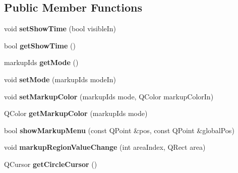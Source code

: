 \subsection*{Public Member Functions}
\begin{DoxyCompactItemize}
\item 
\hypertarget{classimageMarkup_ad00e95e6b26753cec7d6390c750bb922}{
void {\bfseries setShowTime} (bool visibleIn)}
\label{classimageMarkup_ad00e95e6b26753cec7d6390c750bb922}

\item 
\hypertarget{classimageMarkup_aca883d394519475a8988eb3e7c359928}{
bool {\bfseries getShowTime} ()}
\label{classimageMarkup_aca883d394519475a8988eb3e7c359928}

\item 
\hypertarget{classimageMarkup_a288b684b824ff0ad926a949bdc4451fe}{
markupIds {\bfseries getMode} ()}
\label{classimageMarkup_a288b684b824ff0ad926a949bdc4451fe}

\item 
\hypertarget{classimageMarkup_a13a6605444abe8efc548bd55de0f4e9b}{
void {\bfseries setMode} (markupIds modeIn)}
\label{classimageMarkup_a13a6605444abe8efc548bd55de0f4e9b}

\item 
\hypertarget{classimageMarkup_a0b964a9a07732f938ec14bb02238bbbe}{
void {\bfseries setMarkupColor} (markupIds mode, QColor markupColorIn)}
\label{classimageMarkup_a0b964a9a07732f938ec14bb02238bbbe}

\item 
\hypertarget{classimageMarkup_a45b15582a0a92c4d54dea0f2f08cd17a}{
QColor {\bfseries getMarkupColor} (markupIds mode)}
\label{classimageMarkup_a45b15582a0a92c4d54dea0f2f08cd17a}

\item 
\hypertarget{classimageMarkup_a8cbfca43178690e43ba082d85ae3ca81}{
bool {\bfseries showMarkupMenu} (const QPoint \&pos, const QPoint \&globalPos)}
\label{classimageMarkup_a8cbfca43178690e43ba082d85ae3ca81}

\item 
\hypertarget{classimageMarkup_a40c518b9858028badf181ba0a59532d2}{
void {\bfseries markupRegionValueChange} (int areaIndex, QRect area)}
\label{classimageMarkup_a40c518b9858028badf181ba0a59532d2}

\item 
\hypertarget{classimageMarkup_a95f190be9a7a80c9a0f133a0513f23e4}{
QCursor {\bfseries getCircleCursor} ()}
\label{classimageMarkup_a95f190be9a7a80c9a0f133a0513f23e4}


\end{DoxyCompactItemize}
